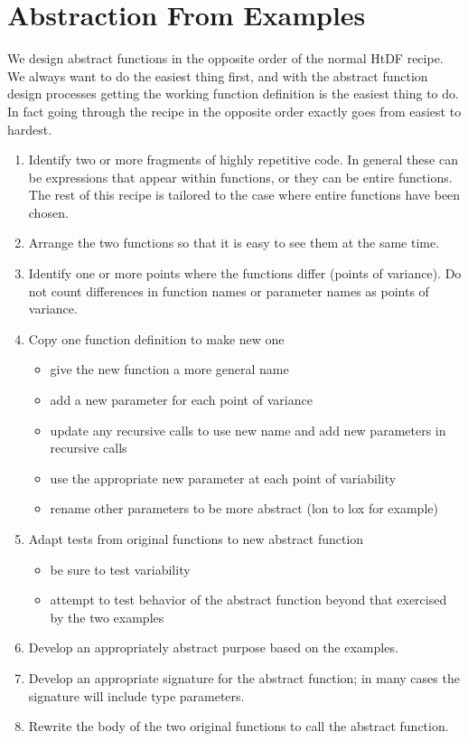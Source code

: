 \documentclass[11pt,a4paper]{report}
\begin{document}
	\section{Abstraction From Examples} \label{sec:abs_from_eg}
	We design abstract functions in the opposite order of the normal HtDF recipe. We always want to
	do the easiest thing first, and with the abstract function design processes getting the working
	function definition is the easiest thing to do. In fact going through the recipe in the opposite order
	exactly goes from easiest to hardest.
	\begin{enumerate}
		\item Identify two or more fragments of highly repetitive code. In general these can be expressions
		that appear within functions, or they can be entire functions. The rest of this recipe is tailored to
		the case where entire functions have been chosen.
		\item Arrange the two functions so that it is easy to see them at the same time.
		\item Identify one or more points where the functions differ (points of variance). Do not count
		differences in function names or parameter names as points of variance.
		\item Copy one function definition to make new one
		\begin{itemize}
			\item give the new function a more general name
			\item add a new parameter for each point of variance
			\item update any recursive calls to use new name and add new parameters in recursive calls
			\item use the appropriate new parameter at each point of variability
			\item rename other parameters to be more abstract (lon to lox for example)
		\end{itemize}
		\item Adapt tests from original functions to new abstract function
		\begin{itemize}
			\item be sure to test variability
			\item attempt to test behavior of the abstract function beyond that exercised by the two examples
		\end{itemize}
		\item Develop an appropriately abstract purpose based on the examples.
		\item Develop an appropriate signature for the abstract function; in many cases the signature will
		include type parameters.
		\item Rewrite the body of the two original functions to call the abstract function.
	\end{enumerate}
\end{document}
